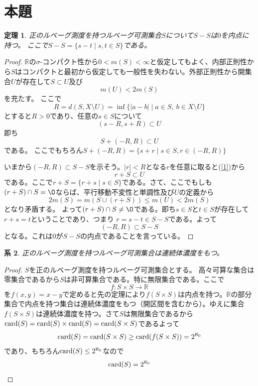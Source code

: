 \documentclass[leqno]{jsarticle}
\newtheorem{thm}{定理}
\newtheorem{cor}[thm]{系}
\newtheorem{lem}[thm]{補題}
\newcommand{\rr}{\mathbb{R}}
\newcommand{\card}{\text{{\rm card}}}
\begin{document}
\section{本題}


\begin{thm}\label{t}
正のルベーグ測度を持つルベーグ可測集合$S$について$S-S$は$0$を内点に持つ。
ここで$S-S=\{s-t \mid s,t\in S\}$である。
\end{thm}
\begin{proof}
$\rr$の$\sigma$-コンパクト性から$0<m(S)<\infty$と仮定してもよく、内部正則性から$S$はコンパクトと最初から仮定しても一般性を失わない。外部正則性から開集合$U$が存在して$S\subset U$及び
\[
m(U)<2m(S)
\]
を充たす。
ここで
\[
R=d(S,X\setminus U)=\inf\{|a-b|\mid a\in S,\  b\in X\setminus U\}
\]
とすると$R>0$であり、任意の$s\in S$について
\[
(s-R,s+R)\subset U
\]
即ち
\begin{equation}\label{1}
S+(-R,R)\subset U 
\end{equation}
である。
ここでもちろん$S+(-R,R)=\{s+r\mid s\in S, r\in (-R,R)\}$
\par
いまから$(-R,R)\subset S-S$を示そう。$|r|<R$となる$r$を任意に取ると(\ref{1})から
\[
r+S\subset U
\]
である。ここで$r+S=\{r+s\mid s\in S\}$である。さて、ここでもしも$(r+S)\cap S=\O$ならば、平行移動不変性と単調性及び$U$の定義から
\[
2m(S)=m(S\cup (r+S))\le m(U)<2m(S)
\]
となり矛盾する。
よって$(r+S)\cap S\neq \O$である。即ち$s\in S$と$t\in S$が存在して$r+s=t$ということであり、つまり
$r=s-t\in S-S$である。よって
\[
(-R,R)\subset S-S
\]
となる。これは$0$が$S-S$の内点であることを言っている。
\end{proof}

\begin{cor}\label{k}
正のルベーグ測度を持つルベーグ可測集合は連続体濃度をもつ。
\end{cor}
\begin{proof}
$S$を正のルベーグ測度を持つルベーグ可測集合とする。
高々可算な集合は零集合であるから$S$は非可算集合である。特に無限集合である。ここで
\[
f:S\times S\to \rr
\]
を$f(x,y)=x-y$で定めると先の定理により$f(S\times S)$は内点を持つ。$\rr$の部分集合で内点を持つ集合は連続体濃度をもつ（開区間を含むから）。ゆえに集合$f(S\times S)$は連続体濃度を持つ。さて$S$は無限集合であるから
$\card(S)=\card(S)\times \card(S)=\card(S\times S)$であるよって
\[
\card(S)=\card(S\times S)\ge \card(f(S\times S))=2^{\aleph_0}
\]
であり、もちろん$\card(S)\le 2^{\aleph_0}$なので
\[
\card(S)=2^{\aleph_0}
\]
\end{proof}
\end{document}
